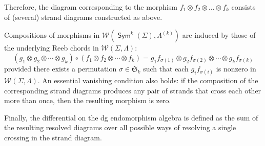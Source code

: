 \documentclass[a4paper, reqno, 11pt]{amsart}
\theoremstyle{definition}
\newcommand{\opname}[1]{\operatorname{\mathsf{#1}}}
\newcommand{\Sym}{\opname{Sym}}
\begin{document}
	Therefore, the diagram corresponding to the morphism $f_1 \otimes f_2 \otimes \dots \otimes f_k$ consists of (several) strand diagrams constructed as above. 
	
	Compositions of morphisms in $\mathcal{W}(\Sym^k(\Sigma), \Lambda^{(k)})$ are induced by those of the underlying Reeb chords in $\mathcal{W}(\Sigma, \Lambda)$:
	$$(g_1\otimes g_2\otimes \cdots \otimes g_k)\circ(f_1\otimes f_2\otimes \cdots \otimes f_k)=g_{1}f_{\sigma(1)}\otimes g_{2}f_{\sigma(2)}\otimes \cdots \otimes g_{k}f_{\sigma(k)}$$
	provided there exists a permutation $\sigma \in \mathfrak{S}_k $ such that each $g_{i}f_{\sigma(i)}$ is nonzero in $\mathcal{W}(\Sigma, \Lambda)$. An essential vanishing condition also holds: if the composition of the corresponding strand diagrams produces any pair of strands that cross each other more than once, then the resulting morphism is zero.
	
	Finally, the differential on the dg endomorphism algebra is defined as the sum of the resulting resolved diagrams over all possible ways of resolving a single crossing in the strand diagram.
	
\end{document}

